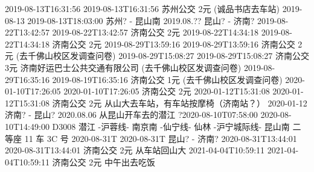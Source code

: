 2019-08-13T16:31:56 2019-08-13T16:31:56 苏州公交 2元 (诚品书店去车站)
2019-08-13 2019-08-13T18:03:00   苏州? - 昆山南
2019.08.??       昆山? - 济南?
2019-08-22T13:42:57 2019-08-22T13:42:57 济南公交 2元
2019-08-22T14:34:18 2019-08-22T14:34:18 济南公交 2元
2019-08-29T13:59:16 2019-08-29T13:59:16 济南公交 2元 (去千佛山校区发调查问卷)
2019-08-29T15:08:27 2019-08-29T15:08:27 济南公交 3元 济南好运巴士公共交通有限公司 (去千佛山校区发调查问卷)
2019-08-29T16:35:16 2019-08-19T16:35:16 济南公交 1元 (去千佛山校区发调查问卷)
2020-01-10T17:26:05 2020-01-10T17:26:05 济南公交 2元
2020-01-12T15:31:08 2020-01-12T15:31:08 济南公交 2元 从山大去车站，有车站按摩椅（济南站？）
2020-01-12       济南? - 昆山?
2020.08.06       从昆山开车去的潜江
?2020-08-10T07:58:00 2020-08-10T14:49:00 D3008 潜江 -沪蓉线- 南京南 -仙宁线- 仙林 -沪宁城际线- 昆山南 二等座 11 车 3C 号
2020-08-31T 2020-08-31T     昆山? - 济南?
2020-08-31T13:44:01 2020-08-31T13:44:01 济南公交 2元 从车站回山大
2021-04-04T10:59:11 2021-04-04T10:59:11 济南公交 2元 中午出去吃饭
